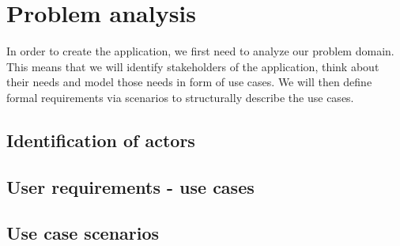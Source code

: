 \chapter{Problem analysis}
In order to create the application, we first need to analyze our problem domain.
This means that we will identify stakeholders of the application, think about their needs and model those needs in form of use cases.
We will then define formal requirements via scenarios to structurally describe the use cases.

\section{Identification of actors}

\section{User requirements - use cases}

\section{Use case scenarios}
